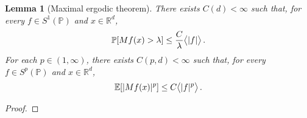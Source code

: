 \documentclass[11pt]{article} %
\numberwithin{equation}{section}
\newtheorem{lemma}[theorem]{Lemma}
\theoremstyle{definition}
\let\originalleft\left
\let\originalright\right
\renewcommand{\left}{\mathopen{}\mathclose\bgroup\originalleft}
\renewcommand{\right}{\aftergroup\egroup\originalright}
\newcommand*{\Rd}{\ensuremath{\mathbb{R}^d}}
\renewcommand{\P}{\mathbb{P}}
\newcommand{\E}{\mathbb{E}}
\begin{document}
\begin{lemma}[Maximal ergodic theorem]
\label{l.maximal.ergodic}
There exists $C(d)<\infty$ such that, for every $f\in S^1(\P)$ and $x\in \Rd$, 
\begin{equation}
\P \left[ Mf(x) > \lambda \right] \leq \frac{C}{\lambda} \bigl \langle |f| \bigr\rangle\,. 
\end{equation}
For each $p\in (1,\infty)$, there exists $C(p,d)<\infty$ such that, for every $f \in S^p(\P)$ and $x\in\Rd$, 
\begin{equation}
\label{e.maximal.ergodic.p}
\E \left[ |Mf(x)|^p \right] 
\leq 
C \bigl\langle |f|^p \bigr\rangle\,. 
\end{equation}
\end{lemma}
\begin{proof}



\end{proof}
\end{document}

